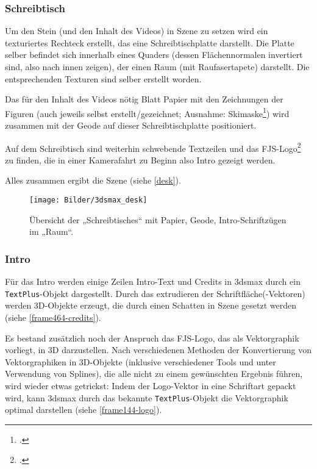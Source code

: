\documentclass{scrreprt}
\begin{document}
\subsubsection{Schreibtisch}

Um den Stein (und den Inhalt des Videos) in Szene zu setzen wird ein texturiertes Rechteck erstellt, das eine Schreibtischplatte darstellt. Die Platte selber befindet sich innerhalb eines Quaders (dessen Flächennormalen invertiert sind, also nach innen zeigen), der einen Raum (mit Raufasertapete) darstellt. Die entsprechenden Texturen sind selber erstellt worden.

Das für den Inhalt des Videos nötig Blatt Papier mit den Zeichnungen der Figuren (auch jeweils selbst erstellt/gezeichnet; Ausnahme: Skimaske\footcite{Pinterest2017}) wird zusammen mit der Geode auf dieser Schreibtischplatte positioniert.

Auf dem Schreibtisch sind weiterhin schwebende Textzeilen und das FJS-Logo\footcite{Strube2017web} zu finden, die in einer Kamerafahrt zu Beginn also Intro gezeigt werden.

Alles zusammen ergibt die Szene (siehe \autoref{desk}).
\begin{figure}[!ht]
\centering
\texttt{[image: Bilder/3dsmax\_desk]}
\caption{Übersicht der „Schreibtisches“ mit Papier, Geode, Intro-Schriftzügen im „Raum“.}
\label{desk}
\end{figure}

\subsubsection{Intro}

Für das Intro werden einige Zeilen Intro-Text und Credits in 3dsmax durch ein \texttt{TextPlus}-Objekt dargestellt. Durch das extrudieren der Schriftfläche(-Vektoren) werden 3D-Objekte erzeugt, die durch einen Schatten in Szene gesetzt werden (siehe \autoref{frame464-credits}). 

Es bestand zusätzlich noch der Anspruch das FJS-Logo, das als Vektorgraphik vorliegt, in 3D darzustellen. Nach verschiedenen Methoden der Konvertierung von Vektorgraphiken in 3D-Objekte (inklusive verschiedener Tools und unter Verwendung von Splines), die alle nicht zu einem gewünschten Ergebnis führen, wird wieder etwas getrickst: Indem der Logo-Vektor in eine Schriftart gepackt wird, kann 3dsmax durch das bekannte \texttt{TextPlus}-Objekt die Vektorgraphik optimal darstellen (siehe \autoref{frame144-logo}).
\end{document}
